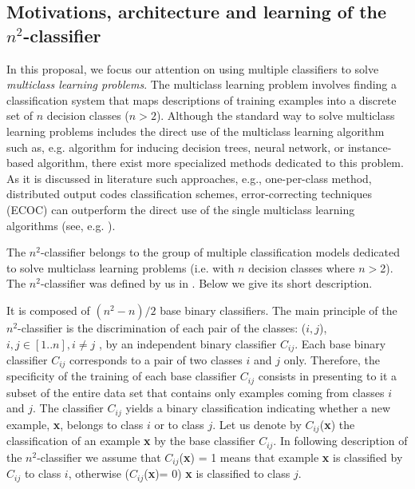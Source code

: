 \documentclass{article}
\begin{document}
\subsection{Motivations, architecture and learning of the $n^{2}$-classifier}

In this proposal, we focus our attention on using multiple classifiers to
solve {\em multiclass learning problems}. The multiclass learning problem
involves finding a classification system that maps descriptions of training
examples into a discrete set of $n$ decision classes ($n>2$). Although the
standard way to solve multiclass learning problems includes the direct use
of the multiclass learning algorithm such as, e.g. algorithm for inducing
decision trees, neural network, or instance-based algorithm, there exist
more specialized methods dedicated to this problem. As it is discussed in
literature such approaches, e.g., one-per-class method, distributed output
codes classification schemes, error-correcting techniques (ECOC) can
outperform the direct use of the single multiclass learning algorithms (see,
e.g. \cite{CS93,DieB}).

The $n^2$-classifier belongs to the group of multiple classification models
dedicated to solve multiclass learning problems (i.e. with $n$ decision
classes where $n > $2). The $n^2$-classifier was defined by us in \cite
{JelStef97}. Below we give its short description.

It is composed of $(n^2-n)/2$ base binary classifiers. The main principle of
the $n^2$-classifier is the discrimination of each pair of the classes: ($i,j
$), $i,j \in [ 1..n ], i \neq j$ , by an independent binary classifier $%
C_{ij}$. Each base binary classifier $C_{ij}$ corresponds to a pair of two
classes $i$ and $j$ only. Therefore, the specificity of the training of each
base classifier $C_{ij}$ consists in presenting to it a subset of the entire
data set that contains only examples coming from classes $i$ and $j$. The
classifier $C_{ij}$ yields a binary classification indicating whether a new
example, {\bf x}, belongs to class $i$ or to class $j$. Let us denote by $%
C_{ij}$({\bf x}) the classification of an example {\bf x} by the base
classifier $C_{ij}$. In following description of the $n^2$-classifier we
assume that $C_{ij}$({\bf x}) = 1 means that example {\bf x} is classified
by $C_{ij}$ to class $i$, otherwise ($C_{ij}$({\bf x})= 0) {\bf x} is
classified to class $j$.
\end{document}
